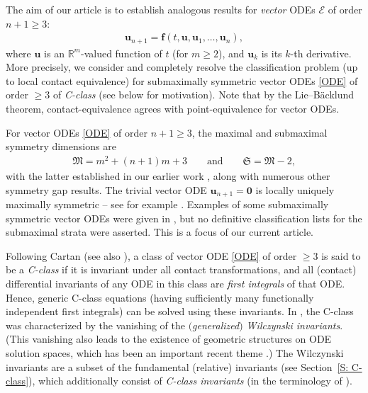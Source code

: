\documentclass[10pt,a4paper]{amsart}
\newcommand\bu{\mathbf{u}}
\newcommand\fM{\mathfrak{M}}
\newcommand\fS{\mathfrak{S}}
\newcommand{\R}{\mathbb{R}}
\newcommand\cE{\mathcal{E}}
\numberwithin{equation}{section}
\begin{document}
The aim of our article is to establish analogous results for {\em vector} ODEs $\cE$ of order $n+1 \geq 3$:
\begin{align} \label{ODE}
\bu_{n+1} = \mathbf{f}(t,\bu,\bu_1,\dots,\bu_{n}),
\end{align}
where $\bu$ is an $\R^m$-valued function of $t$ (for $m \ge 2$), and $\bu_{k}$ is its $k$-th derivative. More precisely, we consider and completely resolve the classification problem (up to local contact equivalence) for submaximally symmetric vector ODEs \eqref{ODE} of order $\ge 3$ of {\em C-class} \cite{CDT2020, Cartan1938} (see below for motivation). Note that by the Lie--B\"{a}cklund theorem, contact-equivalence agrees with point-equivalence for vector ODEs.

For vector ODEs \eqref{ODE} of order $n+1 \ge 3$, the maximal and submaximal symmetry dimensions are
\begin{align}\label{E:MS}
\fM = m^2+(n+1)m+3 \qquad \text{and}\qquad \fS= \fM-2,
\end{align}
with the latter established in our earlier work \cite{KT2021}, along with numerous other symmetry gap results.
The trivial vector ODE $\bu_{n+1} = \mathbf{0}$ is locally uniquely maximally symmetric -- see for example \cite[Corollary~2.8]{KT2021}. Examples of some submaximally symmetric vector ODEs were given in \cite[Table 8]{KT2021}, but no definitive classification lists for the submaximal strata were asserted. This is a focus of our current article.

Following Cartan \cite{Cartan1938} (see also \cite{Bryant1991,CDT2020,Grossman2000}), a class of vector ODE \eqref{ODE} of order $\ge 3$ is said to be a {\em C-class} if it is invariant under all contact transformations, and all (contact) differential invariants of any ODE in this class are {\em first integrals} of that ODE. Hence, generic C-class equations (having sufficiently many functionally independent first integrals) can be solved using these invariants. In \cite[Theorem~4.1 and~4.2]{CDT2020}, the C-class was characterized by the vanishing of the {\em $($generalized$)$ Wilczynski invariants}. (This vanishing also leads to the existence of geometric structures on ODE solution spaces, which has been an important recent theme \cite{CDT2013, DT2006, GN2009, GN2010, Krynski2016}.) The Wilczynski invariants are a subset of the fundamental (relative) invariants (see Section~\ref{S: C-class}), which additionally consist of {\em C-class invariants} (in the terminology of \cite{KT2021}).
\end{document}
